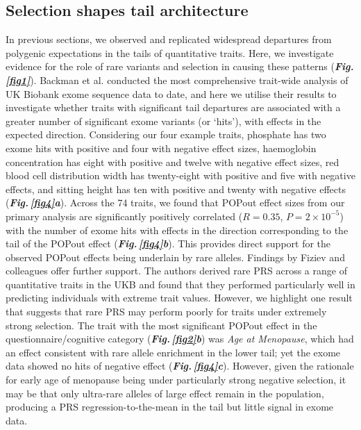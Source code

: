 \documentclass[12pt]{zHenriquesLab-StyleBioRxiv}
\newcommand\fref[1]{\normalsize{\textbf{\textit{Fig.\,\ref{#1}}}}\normalsize{}}
\newcommand\dref[2]{\normalsize{\textbf{\textit{Fig.\,\ref{#1}#2}}}\normalsize{}}
\begin{document}
{{\subsection*{Selection shapes tail architecture}
In previous sections, we observed and replicated widespread 
departures from polygenic expectations in the tails of quantitative 
traits. Here, we investigate evidence for the role of rare variants 
and selection in causing these patterns 
(\fref{fig1}). Backman et al. \cite{Backman2021} conducted 
the most comprehensive trait-wide analysis of UK Biobank 
exome sequence data to date, and here we utilise their 
results to investigate whether traits with significant tail 
departures are associated with a greater number of significant 
exome variants (or ‘hits’), with effects in the expected 
direction. Considering our four example traits, phosphate has
two exome hits with positive and four with negative 
effect sizes, haemoglobin concentration has eight with 
positive and twelve with negative effect sizes, red blood 
cell distribution width has twenty-eight with positive and 
five with negative effects, and sitting height has ten with 
positive and twenty with negative effects (\dref{fig4}{a}). 
Across the 74 traits, we found that POPout effect sizes from 
our primary analysis are significantly positively 
correlated ($R=0.35$, $P=2\times10^{-5}$) with the 
number of exome hits with effects in the direction 
corresponding to the tail of the POPout 
effect (\dref{fig4}{b}). This provides direct 
support for the observed POPout effects 
being underlain by rare alleles. Findings by Fiziev and 
colleagues \cite{Fiziev2023} offer further support. 
The authors derived rare PRS across a range of quantitative 
traits in the UKB and found that they performed particularly well in 
predicting individuals with extreme trait values. 
However, we highlight one result that suggests that rare 
PRS may perform poorly for traits under extremely strong 
selection. The trait with the most significant POPout 
effect in the questionnaire/cognitive category 
(\dref{fig2}{b}) was \textit{Age at Menopause}, 
which had an effect consistent with rare allele 
enrichment in the lower tail; yet the exome data showed 
no hits of negative effect (\dref{fig4}{c}). However, 
given the rationale for early age of menopause being 
under particularly strong negative selection, it may 
be that only ultra-rare alleles of large effect 
remain in the population, producing a PRS regression-to-the-mean 
in the tail but little signal in exome data.
%
%
%
}}
\end{document}
